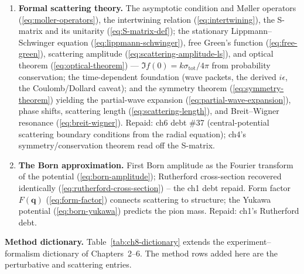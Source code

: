 \begin{enumerate}
\item[\S 8.5] \textbf{Formal scattering theory.} The asymptotic condition and M\o{}ller operators (\eqref{eq:moller-operators}), the intertwining relation (\eqref{eq:intertwining}), the S-matrix and its unitarity (\eqref{eq:S-matrix-def}); the stationary Lippmann--Schwinger equation (\eqref{eq:lippmann-schwinger}), free Green's function (\eqref{eq:free-green}), scattering amplitude (\eqref{eq:scattering-amplitude-ls}), and optical theorem (\eqref{eq:optical-theorem}) --- $\Im f(0)=k\sigma_{\text{tot}}/4\pi$ from probability conservation; the time-dependent foundation (wave packets, the derived $i\epsilon$, the Coulomb/Dollard caveat); and the symmetry theorem (\eqref{eq:symmetry-theorem}) yielding the partial-wave expansion (\eqref{eq:partial-wave-expansion}), phase shifts, scattering length (\eqref{eq:scattering-length}), and Breit--Wigner resonance (\eqref{eq:breit-wigner}). Repaid: ch6 debt \#37 (central-potential scattering boundary conditions from the radial equation); ch4's symmetry/conservation theorem read off the S-matrix.

\item[\S 8.6] \textbf{The Born approximation.} First Born amplitude as the Fourier transform of the potential (\eqref{eq:born-amplitude}); Rutherford cross-section recovered identically (\eqref{eq:rutherford-cross-section}) -- the ch1 debt repaid. Form factor $F(\bm q)$ (\eqref{eq:form-factor}) connects scattering to structure; the Yukawa potential (\eqref{eq:born-yukawa}) predicts the pion mass. Repaid: ch1's Rutherford debt.
\end{enumerate}

\medskip\noindent\textbf{Method dictionary.}
Table~\ref{tab:ch8-dictionary} extends the experiment--formalism dictionary of Chapters~2--6. The method rows added here are the perturbative and scattering entries.

